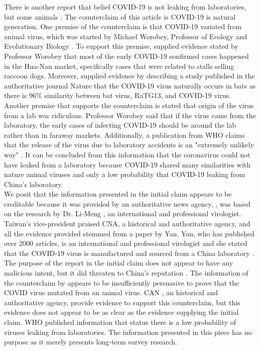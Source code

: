 \documentclass[a4paper, 12pt]{article}
\begin{document}
\begin{CJK*}{UTF8}{bsmi}
    There is another report that belief COVID-19 is not leaking from laboratories, 
    but some animals \parencite{202111190104}. The counterclaim of this article is
    COVID-19 is natural generation. One premise of the counterclaim is that COVID-19
    variated from animal virus, which was started by Michael Worobey, Professor 
    of Ecology and Evolutionary Biology \parencite{52133480, s41586-020-2012-7}.
    To support this premise, \textcite{202111190104} supplied evidence stated by 
    Professor Worobey that most of the early COVID-19 confirmed cases happened in
    the Hua-Nan market, specifically cases that were related to stalls selling 
    raccoon dogs. Moreover, \textcite{52133480} supplied evidence by describing 
    a study published in the authoritative journal Nature that the COVID-19 virus 
    naturally occurs in bats as there is 96\% similarity between bat virus, RaTG13,
    and COVID-19 virus. 
    Another premise that supports the counterclaim is \textcite{202111190104} stated
    that origin of the virus from a lab was ridiculous. Professor Worobey said that 
    if the virus came from the laboratory, the early cases of infecting COVID-19 should
    be around the lab rather than in faraway markets. Additionally, a publication 
    from WHO claims that the release of the virus due to laboratory accidents is 
    an "extremely unlikely way" \parencite{57861634, who}.
    It can be concluded from this information that the coronavirus could not have 
    leaked from a laboratory because COVID-19 shared many similarities with nature 
    animal viruses and only a low probability that COVID-19 leaking from China's 
    laboratory.\\

    We posit that the information presented in the initial claim appears to be
    creditable because it was provided by an authoritative news agency, \textcite{202009150112}, 
    was based on the research by Dr. Li-Meng \textcite{yan_li_meng_2020_4028830}, 
    an international and professional virologist. Taiwan's vice-president \textcite{24227}
    praised CNA, a historical and authoritative agency, and all the evidence provided
    stemmed from a paper by Yan. Yan, who has published over 2000 articles, is
    an international and professional virologist and she stated that the COVID-19
    virus is manufactured and sourced from a China laboratory \parencite{3535570}.
    The purpose of the report in the initial claim does not appear to have any 
    malicious intent, but it did threaten to China's reputation \parencite{202008140064}.
    The information of the counterclaim by \textcite{202111190104} appears to be
    insufficiently persuasive to prove that the COVID virus mutated from an animal virus.
    CAN \parencite{202111190104}, an historical and authoritative agency, provide 
    evidence to support this counterclaim, but this evidence does not appear to be
    as clear as the evidence supplying the initial claim. WHO published information that
    \textcite{who} status there is a low probability of viruses leaking from laboratories.
    The information presented in this piece has no purpose as it merely presents long-term
    survey research.\\


\end{CJK*}
\end{document}
